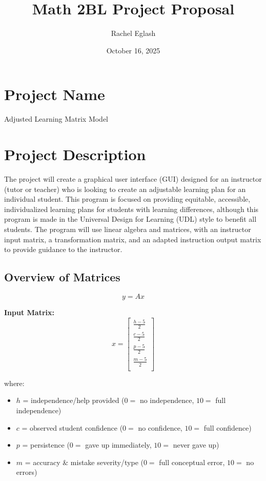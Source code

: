 \documentclass{article}
\title{Math 2BL Project Proposal}
\author{Rachel Eglash}
\date{October 16, 2025}
\begin{document}
\maketitle

\section{Project Name}
    Adjusted Learning Matrix Model

\section{Project Description}
    The project will create a graphical user interface (GUI) designed for an instructor (tutor or teacher) who is looking to create an adjustable learning plan for an individual student. This program is focused on providing equitable, accessible, individualized learning plans for students with learning differences, although this program is made in the Universal Design for Learning (UDL) style to benefit all students. The program will use linear algebra and matrices, with an instructor input matrix, a transformation matrix, and an adapted instruction output matrix to provide guidance to the instructor.

    \subsection{Overview of Matrices}

        \[
            y = Ax
        \]

        \textbf{Input Matrix:}
        \[
            x = \begin{bmatrix}
            \frac{h-5}{2} \\
            \frac{c-5}{2} \\
            \frac{p-5}{2} \\
            \frac{m-5}{2} \\
            \end{bmatrix}
        \]

       where:
            \begin{itemize}
               \item $h$ = independence/help provided ($0 = $ no independence, $10 = $ full independence)
               \item $c$ = observed student confidence ($0 = $ no confidence, $10 = $ full confidence)
               \item $p$ = persistence ($0 = $ gave up immediately, $10 = $ never gave up)
                \item $m$ = accuracy \& mistake severity/type ($0 = $ full conceptual error, $10 = $ no errors)
           \end{itemize}
\end{document}
